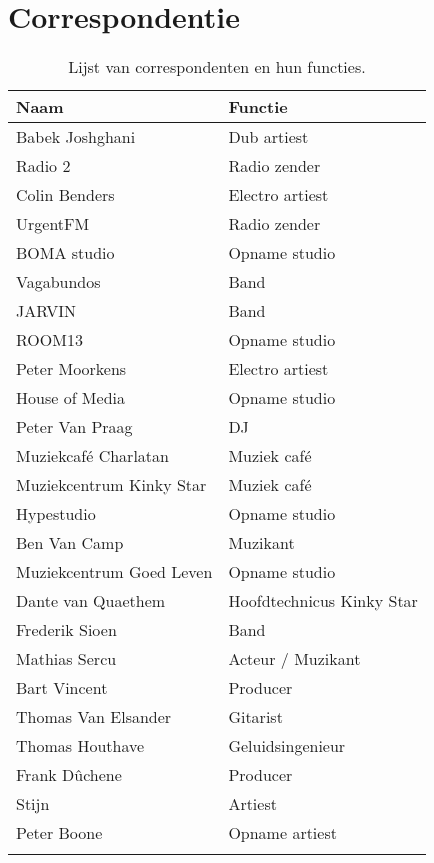 \chapter{Correspondentie}

\begin{longtable}{|l|l|}
    \hline
    \textbf{Naam} & \textbf{Functie} \\
    \hline
    Babek Joshghani & Dub artiest \\
    \hline
    Radio 2 & Radio zender \\
    \hline
    Colin Benders & Electro artiest \\
    \hline
    UrgentFM & Radio zender \\
    \hline
    BOMA studio & Opname studio \\
    \hline
    Vagabundos & Band \\
    \hline
    JARVIN & Band \\
    \hline
    ROOM13 & Opname studio \\
    \hline
    Peter Moorkens & Electro artiest \\
    \hline
    House of Media & Opname studio \\
    \hline
    Peter Van Praag & DJ \\
    \hline
    Muziekcafé Charlatan & Muziek café \\
    \hline
    Muziekcentrum Kinky Star & Muziek café \\
    \hline
    Hypestudio & Opname studio \\
    \hline
    Ben Van Camp & Muzikant \\
    \hline
    Muziekcentrum Goed Leven & Opname studio \\
    \hline
    Dante van Quaethem & Hoofdtechnicus Kinky Star \\
    \hline
    Frederik Sioen & Band \\
    \hline
    Mathias Sercu & Acteur / Muzikant \\
    \hline
    Bart Vincent & Producer \\
    \hline
    Thomas Van Elsander & Gitarist  \\
    \hline
    Thomas Houthave & Geluidsingenieur \\
    \hline
    Frank Dûchene & Producer \\
    \hline
    Stijn & Artiest \\
    \hline
    Peter Boone & Opname artiest \\
    \hline
  \caption{Lijst van correspondenten en hun functies.}
  \label{table:correspondenten}
\end{longtable}

